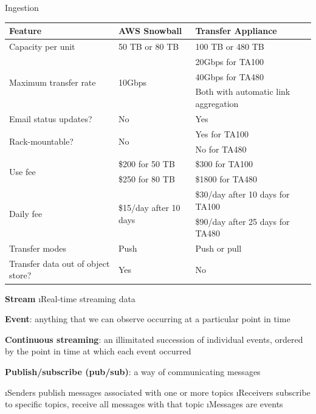 \begin{frame}[allowframebreaks]{Ingestion}
\framebreak
\begin{table}
  \centering
  \footnotesize
    \begin{tabular}{lll}
    \textbf{Feature} & \textbf{AWS Snowball} & \textbf{Transfer Appliance} \\
    \midrule
    Capacity per unit & 50 TB or 80 TB & 100 TB or 480 TB \\
    \multirow{3}[0]{*}{Maximum transfer rate} & \multirow{3}[0]{*}{10Gbps} & 20Gbps for TA100 \\
    \multicolumn{1}{l}{} & \multicolumn{1}{l}{} & 40Gbps for TA480 \\
    \multicolumn{1}{l}{} & \multicolumn{1}{l}{} & Both with automatic link aggregation \\
    Email status updates? & No    & Yes \\
    \multirow{2}[0]{*}{Rack-mountable?} & \multirow{2}[0]{*}{No} & Yes for TA100 \\
    \multicolumn{1}{l}{} & \multicolumn{1}{l}{} & No for TA480 \\
    \multirow{2}[0]{*}{Use fee} & \$200 for 50 TB & \$300 for TA100 \\
    \multicolumn{1}{l}{} & \$250 for 80 TB & \$1800 for TA480 \\
    \multirow{2}[0]{*}{Daily fee} & \multirow{2}[0]{*}{\$15/day after 10 days} & \$30/day after 10 days for TA100 \\
    \multicolumn{1}{l}{} & \multicolumn{1}{l}{} & \$90/day after 25 days for TA480 \\
    Transfer modes & Push  & Push or pull \\
    Transfer data out of object store? & Yes   & No \\
    \end{tabular}%
\end{table}%

\framebreak
\textbf{Stream}
\i Real-time streaming data 


\textbf{Event}: anything that we can observe occurring at a particular point in time

\textbf{Continuous streaming}: an illimitated succession of individual events, ordered by the point in time at which each event occurred

\textbf{Publish/subscribe (pub/sub)}: a way of communicating messages

\i Senders publish messages associated with one or more topics
\i Receivers subscribe to specific topics, receive all messages with that topic
\i Messages are events


\end{frame}

